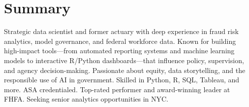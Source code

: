 \section{Summary}

Strategic data scientist and former actuary with deep experience in fraud risk analytics, model governance, and federal workforce data. Known for building high-impact tools—from automated reporting systems and machine learning models to interactive R/Python dashboards—that influence policy, supervision, and agency decision-making. Passionate about equity, data storytelling, and the responsible use of AI in government. Skilled in Python, R, SQL, Tableau, and more. ASA credentialed. Top-rated performer and award-winning leader at FHFA. Seeking senior analytics opportunities in NYC.